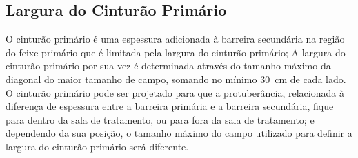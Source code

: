 \documentclass[11pt,a4paper]{article}
\begin{document}
        \subsection{Largura do Cinturão Primário}

            O cinturão primário é uma espessura adicionada à barreira secundária na região do feixe primário que é limitada pela largura do cinturão primário; A largura do cinturão primário por sua vez é determinada através do tamanho máximo da diagonal do maior tamanho de campo, somando no mínimo \qty{30}{cm} de cada lado. O cinturão primário pode ser projetado para que a protuberância, relacionada à diferença de espessura entre a barreira primária e a  barreira secundária, fique para dentro da sala de tratamento, ou para fora da sala de tratamento; e dependendo da sua posição, o tamanho máximo do campo utilizado para definir a largura do cinturão primário será diferente. 
\end{document}
